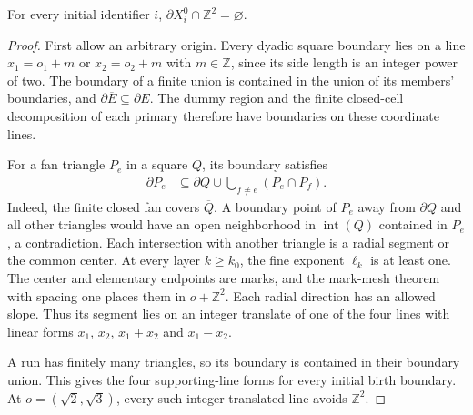 \begin{lemma}
    \label{thm:area_law_initial_birth_boundary_lattice}
    \leanok
    For every initial identifier $i$,
    $\partial X_i^0\cap\mathbb Z^2=\varnothing$.
\end{lemma}
\begin{proof}\leanok
    First allow an arbitrary origin. Every dyadic square boundary lies
    on a line $x_1=o_1+m$ or $x_2=o_2+m$ with $m\in\mathbb Z$,
    since its side length is an integer power of two. The boundary of
    a finite union is contained in the union of its members' boundaries,
    and $\partial\overline E\subseteq\partial E$. The dummy region and
    the finite closed-cell decomposition of each primary therefore
    have boundaries on these coordinate lines.

    For a fan triangle $P_e$ in a square $Q$, its boundary satisfies
    \begin{align}
        \partial P_e
         & \subseteq\partial Q\cup\bigcup_{f\ne e}(P_e\cap P_f).
    \end{align}
    Indeed, the finite closed fan covers $\overline Q$. A boundary
    point of $P_e$ away from $\partial Q$ and all other triangles
    would have an open neighborhood in $\operatorname{int}(Q)$
    contained in $P_e$, a contradiction. Each intersection with another
    triangle is a radial segment or the common center. At every
    layer $k\ge k_0$, the fine exponent $\ell_k$ is at least one.
    The center and elementary endpoints are marks, and the mark-mesh
    theorem with spacing one places them in $o+\mathbb Z^2$.
    Each radial direction has an allowed slope. Thus its segment lies
    on an integer translate of one of the four lines with linear forms
    $x_1$, $x_2$, $x_1+x_2$ and $x_1-x_2$.

    A run has finitely many triangles, so its boundary is contained in
    their boundary union. This gives the four supporting-line forms for
    every initial birth boundary. At $o=(\sqrt2,\sqrt3)$, every such
    integer-translated line avoids $\mathbb Z^2$.
\end{proof}

